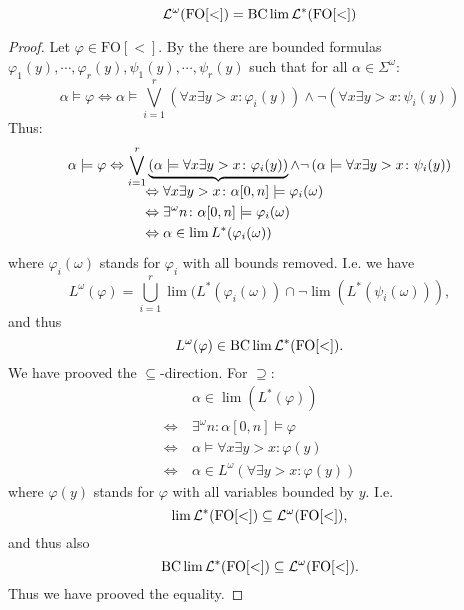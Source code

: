 \begin{theorem}
\[ \mathcal{L}^\omega (\mathrm{FO[<]}) = \operatorname{BC} \lim \mathcal{L}^*(\mathrm{FO[<]}) \]
\begin{proof}
Let $\varphi \in \mathrm{FO[<]}$. By the \cite[Normal Form Theorem (4.4)]{CombR107} there are bounded formulas $\varphi_1(y),\dotsb,\varphi_r(y),\psi_1(y),\dotsb,\psi_r(y)$ such that for all $\alpha \in \Sigma^\omega$:
\[ \alpha \models \varphi \Leftrightarrow \alpha \models \bigvee_{i=1}^r \left( \forall x \exists y > x \colon \varphi_i (y) \right) \wedge \neg \left( \forall x \exists y > x \colon \psi_i (y) \right) \]
Thus:
\[
\alpha \models \varphi \Leftrightarrow \bigvee_{i=1}^r
\underbrace{ \left( \alpha \models \forall x \exists y > x \colon \varphi_i (y) \right) }_
{\mathclap{\quad\quad \begin{aligned}
& \Leftrightarrow \forall x \exists y > x \colon \alpha[0,n] \models \varphi_i(\omega) \\
& \Leftrightarrow \exists^\omega n \colon \alpha[0,n] \models \varphi_i(\omega) \\
& \Leftrightarrow \alpha \in \lim L^*( \varphi_i(\omega) )
\end{aligned}}}
\wedge \neg \left( \alpha \models \forall x \exists y > x \colon \psi_i (y) \right)
\]
where $\varphi_i(\omega)$ stands for $\varphi_i$ with all bounds removed.
I.e. we have
\[ L^\omega(\varphi) = \bigcup_{i=1}^r \lim( L^* (\varphi_i (\omega)) \cap \neg \lim( L^* (\psi_i (\omega))) , \]
and thus
\[ L^\omega(\varphi) \in \operatorname{BC} \lim \mathcal{L}^* (\mathrm{FO[<]}) . \]
We have prooved the $\subseteq$-direction. For $\supseteq$:
\begin{align*}
& \alpha \in \lim( L^*(\varphi) ) \\
\Leftrightarrow \ & \exists^\omega n \colon \alpha[0,n] \models \varphi \\
\Leftrightarrow \ & \alpha \models \forall x \exists y > x \colon \varphi(y) \\
\Leftrightarrow \ & \alpha \in L^\omega ( \forall \exists y > x \colon \varphi(y) )
\end{align*}
where $\varphi(y)$ stands for $\varphi$ with all variables bounded by $y$.
I.e.
\[ \lim \mathcal{L}^* (\mathrm{FO[<]}) \subseteq \mathcal{L}^\omega (\mathrm{FO[<]}) , \]
and thus also
\[ \operatorname{BC} \lim \mathcal{L}^* (\mathrm{FO[<]}) \subseteq \mathcal{L}^\omega (\mathrm{FO[<]}) . \]
Thus we have prooved the equality.
\end{proof}
\end{theorem}

